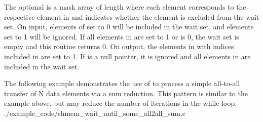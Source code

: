 \begin{apidefinition}
{    The optional  is a mask array of length  where each
    element corresponds to the respective element in  and indicates
    whether the element is excluded from the wait set.  On input, elements of
     set to 0 will be included in the wait set, and elements set to
    1 will be ignored.  If all elements in  are set to 1 or
     is 0, the wait set is empty and this routine returns 0. On
    output, the elements in  with indices included in 
    are set to 1.  If  is a null pointer, it is ignored
    and all elements in  are included in the wait set.
}






\begin{apiexamples}
  \apicexample
      {The following \CorCpp{} example demonstrates the use of
       to process a simple all-to-all transfer
      of N data elements via a sum reduction.  This pattern is similar to the
       example above, but may reduce the number of
      iterations in the while loop. }
      {./example_code/shmem_wait_until_some_all2all_sum.c}
      {}

\end{apiexamples}

\end{apidefinition}
